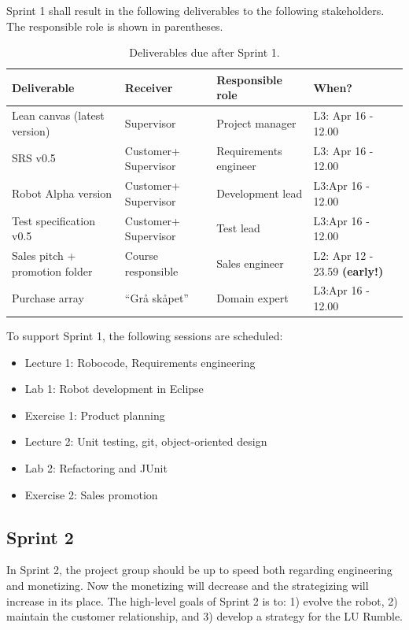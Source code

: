 \documentclass{scrreprt}
\begin{document}
Sprint 1 shall result in the following deliverables to the following stakeholders. The responsible role is shown in parentheses.

\begin{table}[]
\centering
\caption{Deliverables due after Sprint 1.}
\label{tab:sprint1}
\begin{tabular}{|l|p{2cm}|p{2.5cm}|p{3cm}|}
\hline
\textbf{Deliverable}           & \textbf{Receiver}   & \textbf{Responsible role} & \textbf{When?}     \\ \hline
Lean canvas (latest version)   & Supervisor          & Project manager           & L3: Apr 16 - 12.00 \\ \hline
SRS v0.5                       & Customer+ Supervisor & Requirements engineer     & L3: Apr 16 - 12.00 \\ \hline
Robot Alpha version            & Customer+ Supervisor & Development lead          & L3:Apr 16 - 12.00  \\ \hline
Test specification v0.5        & Customer+ Supervisor & Test lead                 & L3:Apr 16 - 12.00  \\ \hline
Sales pitch + promotion folder & Course responsible  & Sales engineer            & L2: Apr 12 - 23.59 \textbf{(early!)}\\ \hline
Purchase array                 & ``Grå skåpet''      & Domain expert             & L3:Apr 16 - 12.00  \\ \hline
\end{tabular}
\end{table}

\newpage

To support Sprint 1, the following sessions are scheduled:
\begin{itemize}
\item Lecture 1: Robocode, Requirements engineering
\item Lab 1: Robot development in Eclipse
\item Exercise 1: Product planning
\item Lecture 2: Unit testing, git, object-oriented design
\item Lab 2: Refactoring and JUnit
\item Exercise 2: Sales promotion
\end{itemize}

\subsection{Sprint 2}
In Sprint 2, the project group should be up to speed both regarding engineering and monetizing. Now the monetizing will decrease and the strategizing will increase in its place. The high-level goals of Sprint 2 is to: 1) evolve the robot, 2) maintain the customer relationship, and 3) develop a strategy for the LU Rumble.
\end{document}
